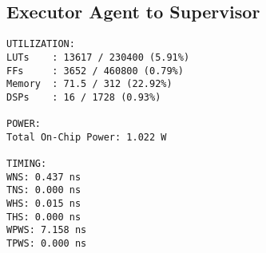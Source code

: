 \subsection{Executor Agent to Supervisor}
\vspace{-0.5em}
\begin{reviewerbox}
\begin{lstlisting}
UTILIZATION:
LUTs    : 13617 / 230400 (5.91%)
FFs     : 3652 / 460800 (0.79%)
Memory  : 71.5 / 312 (22.92%)
DSPs    : 16 / 1728 (0.93%)

POWER:
Total On-Chip Power: 1.022 W

TIMING:
WNS: 0.437 ns
TNS: 0.000 ns
WHS: 0.015 ns
THS: 0.000 ns
WPWS: 7.158 ns
TPWS: 0.000 ns

\end{lstlisting}
\end{reviewerbox}

